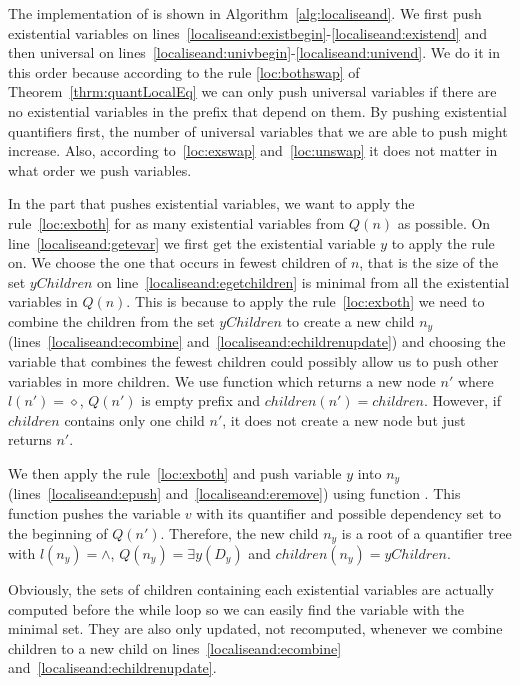 \documentclass[
  digital, %
  color,
  twoside, %
  table,   %
  nolof,     %
  nolot,     %
]{fithesis3}
\theoremstyle{definition}
\theoremstyle{remark}
\newcommand{\prefix}[1]{Q({#1})}
\newcommand{\children}[1]{children({#1})}
\begin{document}
The implementation of  is shown in Algorithm~\ref{alg:localiseand}. We first push existential variables on lines~\ref{localiseand:existbegin}-\ref{localiseand:existend} and then universal on lines~\ref{localiseand:univbegin}-\ref{localiseand:univend}. We do it in this order because according to the rule \eqref{loc:bothswap} of Theorem~\ref{thrm:quantLocalEq} we can only push universal variables if there are no existential variables in the prefix that depend on them. By pushing existential quantifiers first, the number of universal variables that we are able to push might increase. Also, according to~\eqref{loc:exswap} and~\eqref{loc:unswap} it does not matter in what order we push variables.

In the part that pushes existential variables, we want to apply the rule~\eqref{loc:exboth} for as many existential variables from $\prefix{n}$ as possible. On line~\ref{localiseand:getevar} we first get the existential variable $y$ to apply the rule on. We choose the one that occurs in fewest children of $n$, that is the size of the set $yChildren$ on line~\ref{localiseand:egetchildren} is minimal from all the existential variables in $\prefix{n}$. This is because to apply the rule~\eqref{loc:exboth} we need to combine the children from the set $yChildren$ to create a new child $n_y$ (lines~\ref{localiseand:ecombine} and~\ref{localiseand:echildrenupdate}) and choosing the variable that combines the fewest children could possibly allow us to push other variables in more children. We use function  which returns a new node $n'$ where $l(n') = {\diamond}$, $\prefix{n'}$ is empty prefix and $\children{n'} = children$. However, if $children$ contains only one child $n'$, it does not create a new node but just returns $n'$. 

We then apply the rule~\eqref{loc:exboth} and push variable $y$ into $n_y$ (lines~\ref{localiseand:epush} and~\ref{localiseand:eremove}) using function . This function pushes the variable $v$ with its quantifier and possible dependency set to the beginning of $\prefix{n'}$. Therefore, the new child $n_y$ is a root of a quantifier tree with $l(n_y) = {\land}$, $\prefix{n_y} = \exists y(D_y)$ and $\children{n_y} = yChildren$.

Obviously, the sets of children containing each existential variables are actually computed before the while loop so we can easily find the variable with the minimal set. They are also only updated, not recomputed, whenever we combine children to a new child on lines~\ref{localiseand:ecombine} and~\ref{localiseand:echildrenupdate}.
\end{document}
